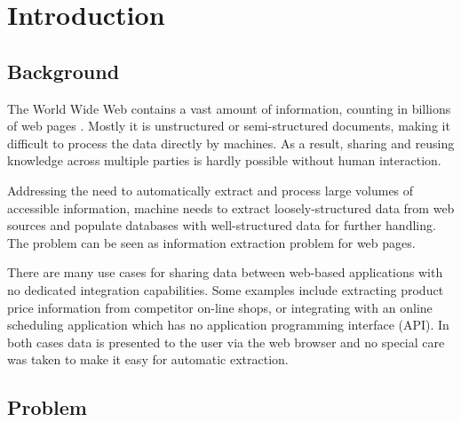 \chapter{Introduction}


\section{Background} %
\label{sec:Problem}


The World Wide Web contains a vast amount of information, counting in billions of web pages \cite{signorini2005a}. Mostly it is unstructured or semi-structured documents, making it difficult to process the data directly by machines. As a result, sharing and reusing knowledge across multiple parties is hardly possible without human interaction.

Addressing the need to automatically extract and process large volumes of accessible information, machine needs to extract loosely-structured data from web sources and populate databases with well-structured data for further handling. The problem can be seen as information extraction problem for web pages. 

There are many use cases for sharing data between web-based applications with no dedicated integration capabilities. Some examples include extracting product price information from competitor on-line shops, or integrating with an online scheduling application which has no application programming interface (API). In both cases data is presented to the user via the web browser and no special care was taken to make it easy for automatic extraction.


\section{Problem}

 
